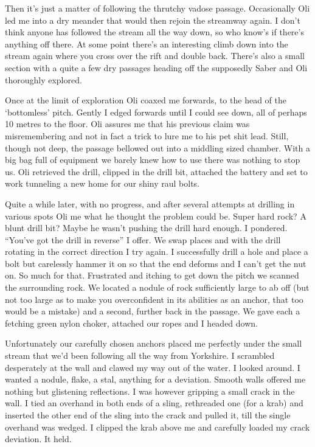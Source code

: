 Then it’s  just a matter of following the thrutchy vadose passage. Occasionally Oli led me into a dry meander that would then rejoin the streamway again. I don’t think anyone has followed the stream all the way down, so who know’s if there’s anything off there. At some point there’s an interesting climb down into the stream again where you cross over the rift and double back. There’s also a small section with a quite a few dry passages heading off the supposedly Saber and Oli thoroughly explored.
 
Once at the limit of exploration Oli coaxed me forwards, to the head of the ‘bottomless’ pitch. Gently I edged forwards until I could see down, all of perhaps 10 metres to the floor. Oli assures me that his previous claim was misremembering and not in fact a trick to lure me to his pet shit lead. Still, though not deep, the passage bellowed out into a middling sized chamber. With a big bag full of equipment we barely knew how to use there was nothing to stop us. Oli retrieved the drill, clipped in the drill bit, attached the battery and set to work tunneling a new home for our shiny raul bolts. 
 
Quite a while later, with no progress, and after several attempts at drilling in various spots  Oli me what he thought the problem could be. Super hard rock? A blunt drill bit? Maybe he wasn’t pushing the drill hard enough. I pondered. “You’ve got the drill in reverse” I offer. We swap places and with the drill rotating in the correct direction I try again. I successfully drill a hole and place a bolt but carelessly hammer it on so that the end deforms and I can’t get the nut on. So much for that. Frustrated and itching to get down the pitch we scanned the surrounding rock. We located a nodule of rock sufficiently large to ab off (but not too large as to make you overconfident in its abilities as an anchor, that too would be a mistake) and a second, further back in the passage. We gave each a fetching green nylon choker, attached our ropes and I headed down.
 
Unfortunately our carefully chosen anchors placed me perfectly under the small stream that we’d been following all the way from Yorkshire. I scrambled desperately at the wall and clawed my way out of the water. I looked around. I wanted a nodule, flake, a stal, anything for a deviation. Smooth walls offered me nothing but glistening reflections. I was however gripping a small crack in the wall. I tied an overhand in both ends of a sling, rethreaded one (for a krab) and inserted the other end of the sling into the crack and pulled it, till the single overhand was wedged. I clipped the krab above me and carefully loaded my crack deviation. It held.

